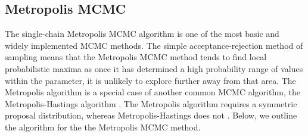 \subsection{Metropolis MCMC} \label{Metropolis_MCMC}
The single-chain Metropolis MCMC algorithm is one of the most basic and widely implemented MCMC methods. The simple acceptance-rejection method of sampling means that the Metropolis MCMC method tends to find local probabilistic maxima as once it has determined a high probability range of values within the parameter, it is unlikely to explore further away from that area. The Metropolis algorithm is a special case of another common MCMC algorithm, the Metropolis-Hastings algorithm \cite{metropolis1953}. The Metropolis algorithm requires a symmetric proposal distribution, whereas Metropolis-Hastings does not \cite{smithCh8}. Below, we outline the algorithm for the the Metropolis MCMC method.
